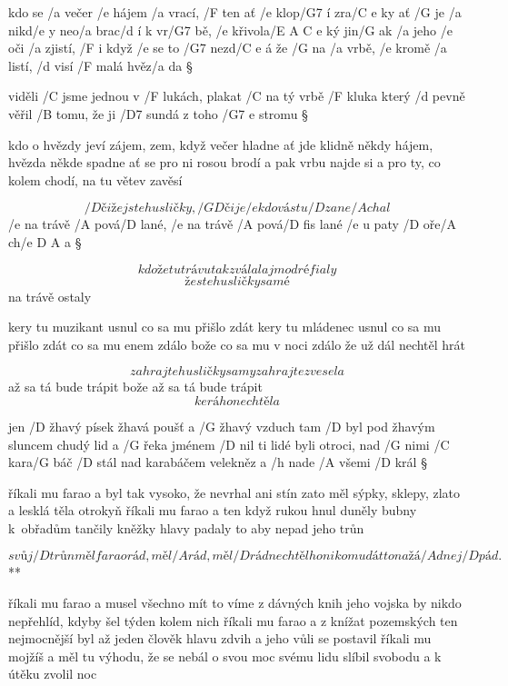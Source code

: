 kdo se /a večer /e hájem /a vrací, /F ten ať /e klop/G7 í zra/{C e} ky
ať /G je /a nikd/e y neo/a brac/d í k vr/G7 bě, /e křivola/{E A C e} ký
jin/G ak /a jeho /e oči /a zjistí, /F i když /e se to /G7 nezd/{C e} á
že /G na /a vrbě, /e kromě /a listí, /d visí /F malá hvěz/a da \S

viděli /C jsme jednou v /F lukách, plakat /C na tý vrbě /F kluka
který /d pevně věřil /B tomu, že ji /D7 sundá z toho /{G7 e} stromu \S

kdo o hvězdy jeví zájem, zem, když večer hladne
ať jde klidně někdy hájem, hvězda někde spadne
ať se pro ni rosou brodí a pak vrbu najde si
a pro ty, co kolem chodí, na tu větev zavěsí




\[ /D čiže jste husličky, /{G D} čije
/e kdo vás tu /D zane/A chal \]
/e na trávě /A pová/D lané, /e na trávě /A pová/{D fis} lané
/e u paty /D oře/A ch/{e D A} a \S

\[ kdože tu trávu tak zválal
aj modré fialy \]
\[ že ste husličky samé \]
na trávě ostaly \s

kery tu muzikant usnul
co sa mu přišlo zdát
kery tu mládenec usnul
co sa mu přišlo zdát
co sa mu enem zdálo
bože co sa mu v noci zdálo
že už dál nechtěl hrát \s

\[ zahrajte husličky samy
zahrajte zvesela \]
až sa tá bude trápit
bože až sa tá bude trápit
\[ kerá ho nechtěla \]




jen /D žhavý písek žhavá poušť a /G žhavý vzduch tam /D byl
pod žhavým sluncem chudý lid a /G řeka jménem /D nil
ti lidé byli otroci, nad /G nimi /C kara/G báč /D stál
nad karabáčem velekněz a /h nade /A všemi /D král \S

říkali mu farao a byl tak vysoko, že nevrhal ani stín
zato měl sýpky, sklepy, zlato a lesklá těla otrokyň \s
říkali mu farao a ten když rukou hnul duněly bubny k~obřadům
tančily kněžky hlavy padaly to aby nepad jeho trůn \s

\R \[ svůj /D trůn měl farao rád, měl /A rád, měl /D rád
   nechtěl ho nikomu dát to na žá/A dnej /D pád. \]**

říkali mu farao a musel všechno mít to víme z dávných knih
jeho vojska by nikdo nepřehlíd, kdyby šel týden kolem nich \s
říkali mu farao a z knížat pozemských ten nejmocnější byl
až jeden člověk hlavu zdvih a jeho vůli se postavil \s
říkali mu mojžíš a měl tu výhodu, že se nebál o svou moc
svému lidu slíbil svobodu a k útěku zvolil noc \s

